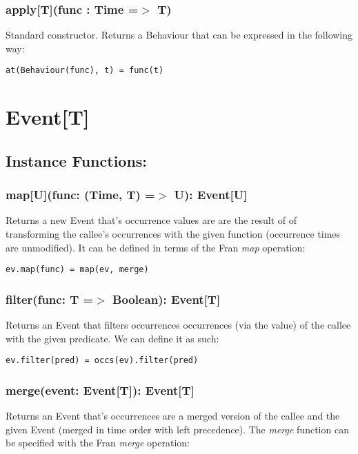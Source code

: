     \subsubsection*{apply[T](func : Time =$>$ T)}
      Standard constructor. Returns a Behaviour
      that can be expressed in the following way:

\begin{verbatim}
at(Behaviour(func), t) = func(t)
\end{verbatim}
      
  \section*{Event[T]}
    \subsection*{Instance Functions:}
    \subsubsection*{map[U](func: (Time, T) =$>$ U): Event[U]}
      Returns a new Event that's occurrence values
      are are the result of of transforming the
      callee's occurrences with the given function (occurrence
      times are unmodified). It can be defined in terms of 
      the Fran \emph{map} operation:

\begin{verbatim}
ev.map(func) = map(ev, merge)
\end{verbatim}      
    
    \subsubsection*{filter(func: T =$>$ Boolean): Event[T]}
      Returns an Event that filters occurrences
      occurrences (via the value) of the callee
      with the given predicate. We can define it as such:

\begin{verbatim}
ev.filter(pred) = occs(ev).filter(pred)
\end{verbatim}
      
    \subsubsection*{merge(event: Event[T]): Event[T]}
      Returns an Event that's occurrences
      are a merged version of the callee
      and the given Event (merged in time order
      with left precedence). The \emph{merge}
      function can be specified with the Fran \emph{merge}
      operation:

